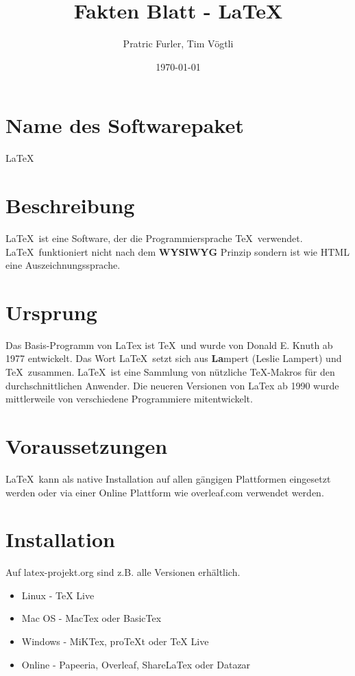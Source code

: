 \documentclass{article}
\title{Fakten Blatt - \LaTeX}
\author{Pratric Furler, Tim Vögtli}
\date{\today}
\begin{document}
\maketitle
\thispagestyle{fancy}

\section{Name des Softwarepaket}
\LaTeX

\section{Beschreibung}
\LaTeX\ ist eine Software, der die Programmiersprache \TeX\ verwendet. \LaTeX\ funktioniert nicht nach dem \textbf{WYSIWYG} Prinzip sondern ist wie HTML eine Auszeichnungssprache.

\section{Ursprung}

Das Basis-Programm von LaTex ist \TeX\ und wurde von Donald E. Knuth ab 1977 entwickelt. Das Wort \LaTeX\ setzt sich aus \textbf{La}mpert (Leslie Lampert) und \TeX\ zusammen. \LaTeX\ ist eine Sammlung von nützliche \TeX-Makros für den durchschnittlichen Anwender. Die neueren Versionen von LaTex ab 1990 wurde mittlerweile von verschiedene Programmiere mitentwickelt.

\section{Voraussetzungen}

\LaTeX\ kann als native Installation auf allen gängigen Plattformen eingesetzt werden oder via einer Online Plattform wie overleaf.com verwendet werden.

\section{Installation}

Auf latex-projekt.org sind z.B. alle Versionen erhältlich.
\begin{itemize}
	\item Linux - TeX Live
	\item Mac OS - MacTex oder BasicTex
	\item Windows - MiKTex, proTeXt oder TeX Live
	\item Online - Papeeria, Overleaf, ShareLaTex oder Datazar
\end{itemize}
\end{document}
